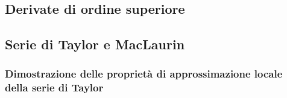 \documentclass[letterpaper,10pt,italian]{jupyterBook}
\begin{document}
\subsection{Derivate di ordine superiore}
\label{\detokenize{ch/infinitesimal_calculus/derivatives-notes:derivate-di-ordine-superiore}}\label{\detokenize{ch/infinitesimal_calculus/derivatives-notes:infinitesimal-calculus-derivatives-higher-notes}}

\subsection{Serie di Taylor e MacLaurin}
\label{\detokenize{ch/infinitesimal_calculus/derivatives-notes:serie-di-taylor-e-maclaurin}}\label{\detokenize{ch/infinitesimal_calculus/derivatives-notes:infinitesimal-calculus-derivatives-taylor-notes}}\subsubsection*{Dimostrazione delle proprietà di approssimazione locale della serie di Taylor}
\end{document}
